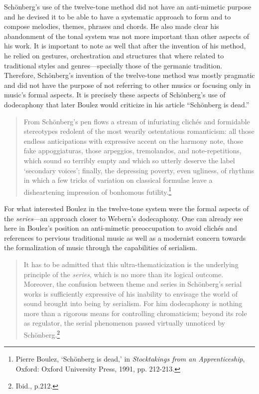 Sch\"{o}nberg's use of the twelve-tone method did not have an anti-mimetic purpose and he devised it to be able to have a systematic approach to form and to compose melodies, themes, phrases and chords. He also made clear his abandonment of the tonal system was not more important than other aspects of his work. It is important to note as well that after the invention of his method, he relied on gestures, orchestration and structures that where related to traditional styles and genres---specially those of the germanic tradition. Therefore, Sch\"{o}nberg's invention of the twelve-tone method was mostly pragmatic and did not have the purpose of not referring to other musics or focusing only in music's formal aspects. It is precisely these aspects of Sch\"{o}nberg's use of dodecaphony that later Boulez would criticize in his article ``Sch\"{o}nberg is dead.''
\begin{quote}
From Sch\"{o}nberg's pen flows a stream of infuriating clich\'{e}s and formidable stereotypes redolent of the most wearily ostentatious romanticism: all those endless anticipations with expressive accent on the harmony note, those fake appoggiaturas, those arpeggios, tremolandos, and note-repetitions, which sound so terribly empty and which so utterly deserve the label `secondary voices'; finally, the depressing poverty, even ugliness, of rhythms in which a few tricks of variation on classical formulae leave a disheartening impression of bonhomous futility.\footnote{Pierre Boulez, `Sch\"{o}nberg is dead,' in \emph{Stocktakings from an Apprenticeship}, Oxford: Oxford University Press, 1991, pp. 212-213.}
\end{quote}
For what interested Boulez in the twelve-tone system were the formal aspects of the \emph{series}---an approach closer to Webern's dodecaphony. One can already see here in Boulez's position an anti-mimetic preoccupation to avoid clich\'{e}s and references to pervious traditional music as well as a modernist concern towards the formalization of music through the capabilities of serialism.

\begin{quote}
It has to be admitted that this ultra-thematicization is the underlying principle of the \emph{series}, which is no more than its logical outcome. Moreover, the confusion between theme and series in Sch\"{o}nberg's serial works is sufficiently expressive of his inability to envisage the world of sound brought into being by serialism. For him dodecaphony is nothing more than a rigorous means for controlling chromaticism; beyond its role as regulator, the serial phenomenon passed virtually unnoticed by Sch\"{o}nberg.\footnote{Ibid., p.212.}
\end{quote}

